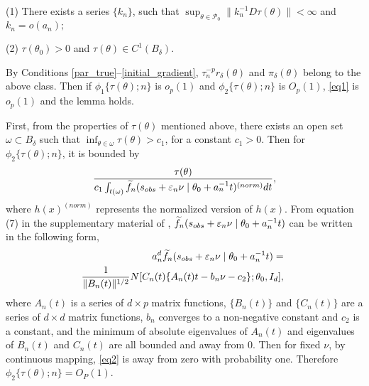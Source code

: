 	\noindent (1) There exists a series $\{k_{n}\}$, such that $\sup_{\theta\in\mathcal{P}_{0}}\|k_{n}^{-1}D\tau(\theta)\|<\infty$
	and $k_{n}=o(a_{n});$ 
	
    \noindent (2)	$\tau(\theta_{0})>0$ and $\tau(\theta)\in C^{1}(B_{\delta}).$ 
	
	
	By Conditions \ref{par_true}--\ref{initial_gradient}, $\tau_{n}^{-p}r_{\delta}(\theta)$
	and $\pi_{\delta}(\theta)$ belong to the above class. Then if $\phi_{1}\{\tau(\theta);n\}$
	is $o_{p}(1)$ and $\phi_{2}\{\tau(\theta);n\}$ is $O_{p}(1)$, \eqref{eq1}
	is $o_{p}(1)$ and the lemma holds. 
	
	First, from the properties of $\tau(\theta)$ mentioned above, there exists an open set $\omega\subset B_{\delta}$
	such that $\inf_{\theta\in\omega}\tau(\theta)>c_{1}$, for a constant
	$c_{1}>0$. Then for $\phi_{2}\{\tau(\theta);n\}$, it is bounded
	by 
	\[
	\frac{\tau(\theta)}{c_{1}\int_{t(\omega)}\widetilde{f}_{n}(s_{{\relax obs}}+\varepsilon_{n}\nu\mid\theta_{0}+a_{n}^{-1}t)^{(norm)}dt},
	\]
	where $h(x)^{(norm)}$ represents the normalized version of $h(x)$.
	From equation (7) in the supplementary material of \cite{Li2016},
	$\widetilde{f}_{n}(s_{{\relax obs}}+\varepsilon_{n}\nu\mid\theta_0+a_{n}^{-1}t)$
	can be written in the following form, 
	\begin{eqnarray}
	&&\hspace{-1cm}a_{n}^{d}\ftil_{n}(s_{{\rm obs}}+\veps_{n}\nu\mid\theta_0+a_{n}^{-1}t)= \notag \\
	&&\hspace{-0.5cm}\frac{1}{\|B_{n}(t)\|^{1/2}}N[C_{n}(t)\{A_{n}(t)t-b_{n}\nu-c_{2}\};\theta_0,I_{d}],\label{eq2}
	\end{eqnarray}
	where $A_{n}(t)$ is a series of $d\times p$ matrix functions, $\{B_{n}(t)\}$
	and $\{C_{n}(t)\}$ are a series of $d\times d$ matrix functions,
	$b_{n}$ converges to a non-negative constant and $c_{2}$ is a constant,
	and the minimum of absolute eigenvalues of $A_{n}(t)$ and eigenvalues
	of $B_{n}(t)$ and $C_{n}(t)$ are all bounded and away from $0$.
	Then for fixed $\nu$, by continuous mapping, \eqref{eq2} is away
	from zero with probability one. Therefore $\phi_{2}\{\tau(\theta);n\}=O_{P}(1)$.
	

